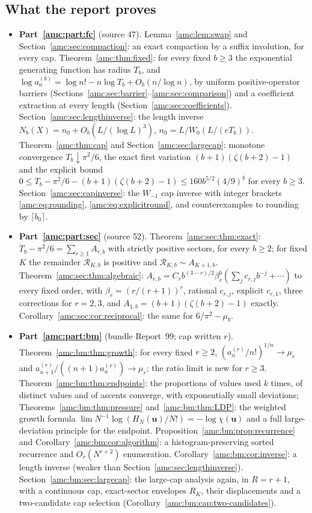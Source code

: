 \documentclass[11pt,letterpaper]{article}
\theoremstyle{remark}\newtheorem{remark}[theorem]{Remark}
\newcommand{\RR}{\mathcal R}
\newcommand{\bu}{\boldsymbol u}
\begin{document}
\subsection*{What the report proves}
\label{amc:guide:results}
\begin{itemize}
\item \textbf{Part~\ref{amc:part:fc}} (source 47). Lemma~\ref{amc:lem:swap} and Section~\ref{amc:sec:compaction}: an exact compaction by a suffix involution, for every cap. Theorem~\ref{amc:thm:fixed}: for every fixed $b\ge3$ the exponential generating function has radius $T_b$, and $\log a_n^{(b)}=\log n!-n\log T_b+O_b(n/\log n)$, by uniform positive-operator barriers (Sections~\ref{amc:sec:barrier}--\ref{amc:sec:comparison}) and a coefficient extraction at every length (Section~\ref{amc:sec:coefficients}). Section~\ref{amc:sec:lengthinverse}: the length inverse $N_b(X)=n_0+O_b(L/(\log L)^3)$, $n_0=L/W_0(L/(eT_b))$. Theorem~\ref{amc:thm:cap} and Section~\ref{amc:sec:largecap}: monotone convergence $T_b\downarrow\pi^2/6$, the exact first variation $(b+1)(\zeta(b+2)-1)$ and the explicit bound $0\le T_b-\pi^2/6-(b+1)(\zeta(b+2)-1)\le160b^{5/2}(4/9)^b$ for every $b\ge3$. Section~\ref{amc:sec:capinverse}: the $W_{-1}$ cap inverse with integer brackets \eqref{amc:eq:rounding}, \eqref{amc:eq:explicitround}, and counterexamples to rounding by $\lceil b_0\rceil$.
\item \textbf{Part~\ref{amc:part:sec}} (source 52). Theorem~\ref{amc:sec:thm:exact}: $T_b-\pi^2/6=\sum_{r\ge1}A_{r,b}$ with strictly positive sectors, for every $b\ge2$; for fixed $K$ the remainder $\RR_{K,b}$ is positive and $\RR_{K,b}\sim A_{K+1,b}$. Theorem~\ref{amc:sec:thm:algebraic}: $A_{r,b}=C_rb^{(3-r)/2}\beta_r^b(\sum_jc_{r,j}b^{-j}+\cdots)$ to every fixed order, with $\beta_r=(r/(r+1))^r$, rational $c_{r,j}$, explicit $c_{r,1}$, three corrections for $r=2,3$, and $A_{1,b}=(b+1)(\zeta(b+2)-1)$ exactly. Corollary~\ref{amc:sec:cor:reciprocal}: the same for $6/\pi^2-\mu_b$.
\item \textbf{Part~\ref{amc:part:bm}} (bundle Report~99; cap written $r$). Theorem~\ref{amc:bm:thm:growth}: for every fixed $r\ge2$, $(a^{(r)}_n/n!)^{1/n}\to\mu_r$ and $a^{(r)}_{n+1}/((n+1)a^{(r)}_n)\to\mu_r$; the ratio limit is new for $r\ge3$. Theorem~\ref{amc:bm:thm:endpoints}: the proportions of values used $k$ times, of distinct values and of ascents converge, with exponentially small deviations; Theorems~\ref{amc:bm:thm:pressure} and~\ref{amc:bm:thm:LDP}: the weighted growth formula $\lim N^{-1}\log(H_N(\bu)/N!)=-\log\chi(\bu)$ and a full large-deviation principle for the endpoint. Proposition~\ref{amc:bm:prop:recurrence} and Corollary~\ref{amc:bm:cor:algorithm}: a histogram-preserving sorted recurrence and $O_r(N^{r+2})$ enumeration. Corollary~\ref{amc:bm:cor:inverse}: a length inverse (weaker than Section~\ref{amc:sec:lengthinverse}). Section~\ref{amc:bm:sec:largecap}: the large-cap analysis again, in $R=r+1$, with a continuous cap, exact-sector envelopes $R_K$, their displacements and a two-candidate cap selection (Corollary~\ref{amc:bm:cap:two-candidates}).
\end{itemize}
\end{document}
